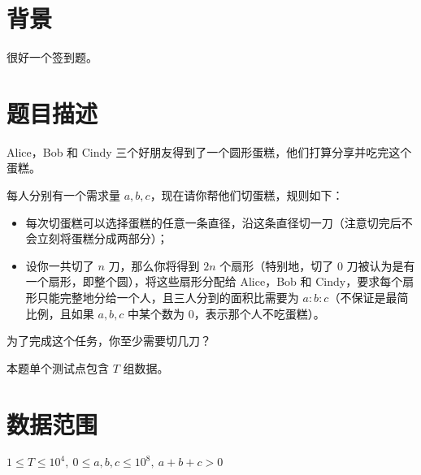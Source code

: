\documentclass[a4paper,10pt]{article}
\begin{document}
\newpage

\section*{背景}

很好一个签到题。

\section*{题目描述}

Alice，Bob 和 Cindy 三个好朋友得到了一个圆形蛋糕，他们打算分享并吃完这个蛋糕。

每人分别有一个需求量 $a,b,c$，现在请你帮他们切蛋糕，规则如下：

\begin{itemize}
\item 每次切蛋糕可以选择蛋糕的任意一条直径，沿这条直径切一刀（注意切完后不会立刻将蛋糕分成两部分）；

\item 设你一共切了 $n$ 刀，那么你将得到 $2n$ 个扇形（特别地，切了 $0$ 刀被认为是有一个扇形，即整个圆），将这些扇形分配给 Alice，Bob 和 Cindy，要求每个扇形只能完整地分给一个人，且三人分到的面积比需要为 $a:b:c$（不保证是最简比例，且如果 $a,b,c$ 中某个数为 $0$，表示那个人不吃蛋糕）。
\end{itemize}

为了完成这个任务，你至少需要切几刀？

本题单个测试点包含 $T$ 组数据。

\section*{数据范围}

$1\leq T\leq 10^4,\ 0\leq a,b,c\leq 10^8,\ a+b+c>0$

\newpage
\end{document}
